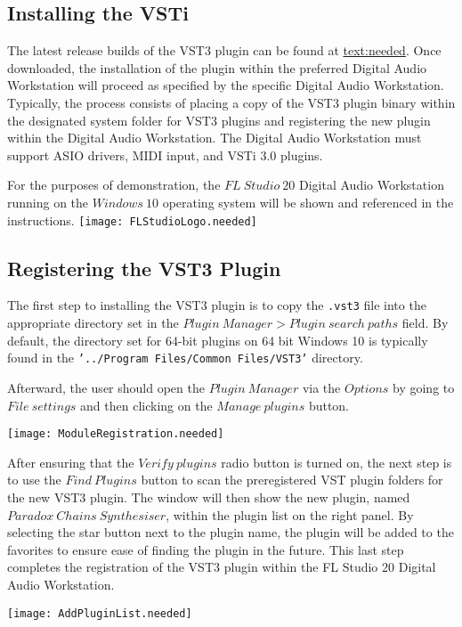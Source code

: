 \documentclass[a4paper,12pt]{report}
\begin{document}
\subsection{Installing the VSTi}
The latest release builds of the VST3 plugin can be found at \href{link:needed}{text:needed}. Once downloaded, the installation of the plugin within the preferred Digital Audio Workstation will proceed as specified by the specific Digital Audio Workstation. Typically, the process consists of placing a copy of the VST3 plugin binary within the designated system folder for VST3 plugins and registering the new plugin within the Digital Audio Workstation. The Digital Audio Workstation must support ASIO drivers, MIDI input, and VSTi 3.0 plugins.

For the purposes of demonstration, the $FL\ Studio\ 20$ Digital Audio Workstation running on the $Windows\ 10$ operating system will be shown and referenced in the instructions.
\texttt{[image: FLStudioLogo.needed]}

\subsection{Registering the VST3 Plugin}
The first step to installing the VST3 plugin is to copy the \texttt{.vst3} file into the appropriate directory set in the $Plugin\ Manager > Plugin\ search\ paths$ field. By default, the directory set for 64-bit plugins on 64 bit Windows 10 is typically found in the \texttt{'../Program Files/Common Files/VST3'} directory. 

Afterward, the user should open the $Plugin\ Manager$ via the $Options$ by going to $File\ settings$ and then clicking on the $Manage\ plugins$ button. 

\texttt{[image: ModuleRegistration.needed]}

After ensuring that the $Verify\ plugins$ radio button is turned on, the next step is to use the $Find\ Plugins$ button to scan the preregistered VST plugin folders for the new VST3 plugin. The window will then show the new plugin, named $Paradox\ Chains\ Synthesiser$, within the plugin list on the right panel. By selecting the star button next to the plugin name, the plugin will be added to the favorites to ensure ease of finding the plugin in the future. This last step completes the registration of the VST3 plugin within the FL Studio 20 Digital Audio Workstation.

\texttt{[image: AddPluginList.needed]}
\end{document}
